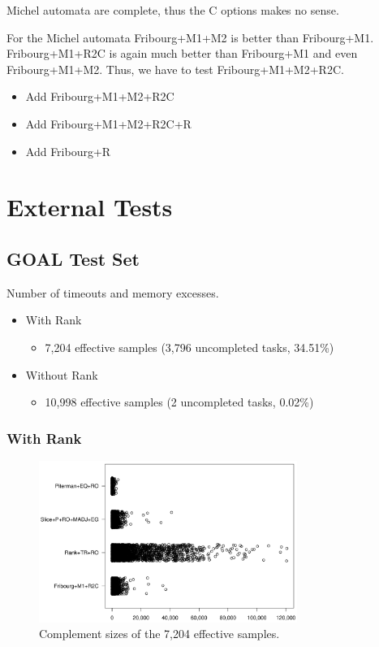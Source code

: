 Michel automata are complete, thus the C options makes no sense.

For the Michel automata Fribourg+M1+M2 is better than Fribourg+M1. Fribourg+M1+R2C is again much better than Fribourg+M1 and even Fribourg+M1+M2. Thus, we have to test Fribourg+M1+M2+R2C. 

\begin{itemize}
\item Add Fribourg+M1+M2+R2C
\item Add Fribourg+M1+M2+R2C+R
\item Add Fribourg+R
\end{itemize}




\section{External Tests}

\subsection{GOAL Test Set}

\begin{table}[ht]
\centering

\caption{Number of timeouts and memory excesses.}
\end{table}

\begin{itemize}
\item With Rank
  \begin{itemize}
  \item 7,204 effective samples (3,796 uncompleted tasks, 34.51\%)
  \end{itemize}
\item Without Rank
  \begin{itemize}
  \item 10,998 effective samples (2 uncompleted tasks, 0.02\%)
  \end{itemize}
\end{itemize}


\subsubsection{With Rank}

\begin{figure}[ht]
\centering
\includegraphics[width=0.75\textwidth]{figures/r/external/goal/s.stripchart.with_rank.pdf}
\caption{Complement sizes of the 7,204 effective samples.}
\end{figure}

